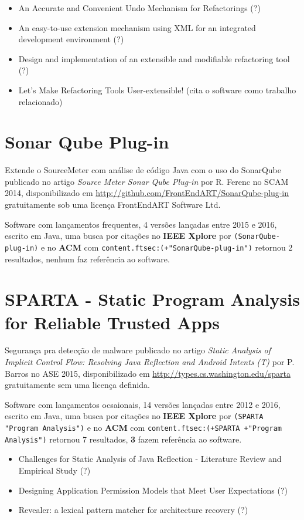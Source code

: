 \begin{itemize}
\item An Accurate and Convenient Undo Mechanism for Refactorings (?)
\item An easy-to-use extension mechanism using XML for an integrated development environment (?)
\item Design and implementation of an extensible and modifiable refactoring tool (?)
\item Let's Make Refactoring Tools User-extensible! (cita o software como trabalho relacionado)
\end{itemize}

\section{Sonar Qube Plug-in}

Extende o SourceMeter com análise de código Java com o uso do SonarQube
publicado no artigo {\it Source Meter Sonar Qube Plug-in}
por R. Ferenc
no SCAM 2014,
disponibilizado em \url{http://github.com/FrontEndART/SonarQube-plug-in}
gratuitamente
sob uma licença FrontEndART Software Ltd.

Software com lançamentos frequentes,
4 versões lançadas
entre 2015 e 2016,
escrito em Java,
uma busca por citações no {\bf IEEE Xplore} por
\texttt{(SonarQube-plug-in)}
e no {\bf ACM} com
\texttt{content.ftsec:(+"SonarQube-plug-in")}
retornou
2 resultados,
nenhum faz referência ao software.


\section{SPARTA - Static Program Analysis for Reliable Trusted Apps}

Segurança pra detecção de malware
publicado no artigo {\it Static Analysis of Implicit Control Flow: Resolving Java Reflection and Android Intents (T)}
por P. Barros
no ASE 2015,
disponibilizado em \url{http://types.cs.washington.edu/sparta}
gratuitamente
sem uma licença definida.

Software com lançamentos ocsaionais,
14 versões lançadas
entre 2012 e 2016,
escrito em Java,
uma busca por citações no {\bf IEEE Xplore} por
\texttt{(SPARTA "Program Analysis")}
e no {\bf ACM} com
\texttt{content.ftsec:(+SPARTA +"Program Analysis")}
retornou
7 resultados,
{\bf 3} fazem referência ao software.

\begin{itemize}
\item Challenges for Static Analysis of Java Reflection - Literature Review and Empirical Study (?)
\item Designing Application Permission Models that Meet User Expectations (?)
\item Revealer: a lexical pattern matcher for architecture recovery (?)
\end{itemize}

